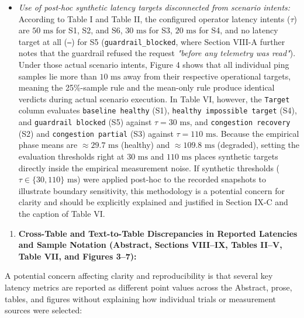 \documentclass[11pt,a4paper]{article}
\begin{document}
\begin{itemize}[leftmargin=1.8em,itemsep=2pt]
\item \emph{Use of post-hoc synthetic latency targets disconnected from scenario intents:} According to Table I and Table II, the configured operator latency intents ($\tau$) are $50\text{ ms}$ for S1, S2, and S6, $30\text{ ms}$ for S3, $20\text{ ms}$ for S4, and no latency target at all (\texttt{–}) for S5 (\texttt{guardrail\_blocked}, where Section VIII-A further notes that the guardrail refused the request \emph{"before any telemetry was read"}). Under those actual scenario intents, Figure 4 shows that all individual ping samples lie more than $10\text{ ms}$ away from their respective operational targets, meaning the 25\%-sample rule and the mean-only rule produce identical verdicts during actual scenario execution. In Table VI, however, the \texttt{Target} column evaluates \texttt{baseline healthy} (S1), \texttt{healthy impossible target} (S4), and \texttt{guardrail blocked} (S5) against $\tau = 30\text{ ms}$, and \texttt{congestion recovery} (S2) and \texttt{congestion partial} (S3) against $\tau = 110\text{ ms}$. Because the empirical phase means are $\approx 29.7\text{ ms}$ (healthy) and $\approx 109.8\text{ ms}$ (degraded), setting the evaluation thresholds right at $30\text{ ms}$ and $110\text{ ms}$ places synthetic targets directly inside the empirical measurement noise. If synthetic thresholds ($\tau \in \{30, 110\}\text{ ms}$) were applied post-hoc to the recorded snapshots to illustrate boundary sensitivity, this methodology is a potential concern for clarity and should be explicitly explained and justified in Section IX-C and the caption of Table VI.
\end{itemize}
\begin{enumerate}[leftmargin=1.6em,itemsep=3pt]
\item \textbf{Cross-Table and Text-to-Table Discrepancies in Reported Latencies and Sample Notation (Abstract, Sections VIII–IX, Tables II–V, Table VII, and Figures 3–7):}
\end{enumerate}
A potential concern affecting clarity and reproducibility is that several key latency metrics are reported as different point values across the Abstract, prose, tables, and figures without explaining how individual trials or measurement sources were selected:
\end{document}
